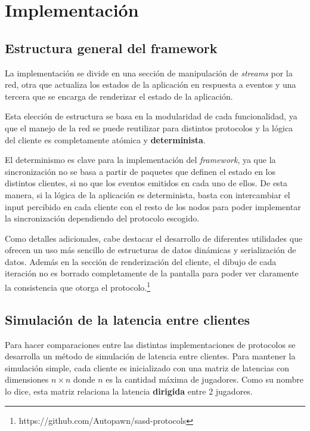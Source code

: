 \section{Implementación}


\subsection{Estructura general del framework}

La implementación se divide en una sección de manipulación de \emph{streams} por la red, otra que actualiza los estados de la aplicación en respuesta a eventos y una tercera que se encarga de renderizar el estado de la aplicación.

Esta elección de estructura se basa en la modularidad de cada funcionalidad, ya que el manejo de la red se puede reutilizar para distintos protocolos y la lógica del cliente es completamente atómica y \textbf{determinista}.

El determinismo es clave para la implementación del \emph{framework}, ya que la sincronización no se basa a partir de paquetes que definen el estado en los distintos clientes, si no que los eventos emitidos en cada uno de ellos. De esta manera, si la lógica de la aplicación es determinista, basta con intercambiar el input percibido en cada cliente con el resto de los nodos para poder implementar la sincronización dependiendo del protocolo escogido.

Como detalles adicionales, cabe destacar el desarrollo de diferentes utilidades que ofrecen un uso más sencillo de estructuras de datos dinámicas y serialización de datos. Además en la sección de renderización del cliente, el dibujo de cada iteración no es borrado completamente de la pantalla para poder ver claramente la consistencia que otorga el protocolo.\footnote{https://github.com/Autopawn/sasd-protocols}

\subsection{Simulación de la latencia entre clientes}

Para hacer comparaciones entre las distintas implementaciones de protocolos se desarrolla un método de simulación de latencia entre clientes. Para mantener la simulación simple, cada cliente es inicializado con una matriz de latencias con dimensiones $n\times n$ donde $n$ es la cantidad máxima de jugadores. Como su nombre lo dice, esta matriz relaciona la latencia \textbf{dirigida} entre 2 jugadores.

